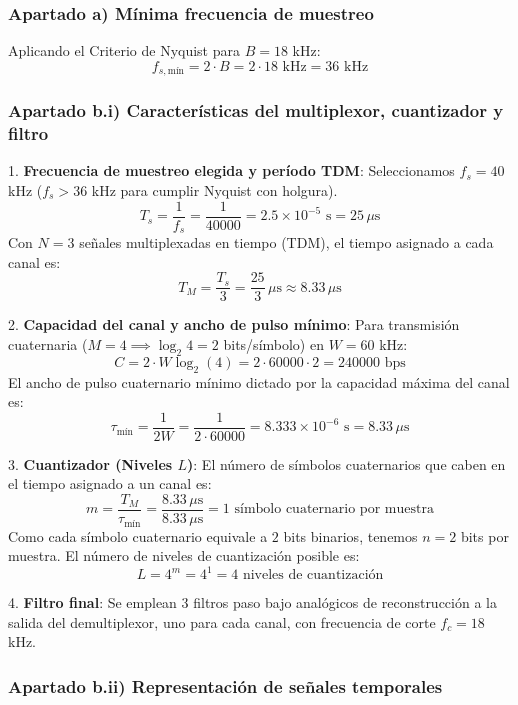 \newpage
\begin{resolucion}
\subsubsection*{Apartado a) Mínima frecuencia de muestreo}

Aplicando el Criterio de Nyquist para $B = 18$ kHz:
\[
f_{s,\text{mín}} = 2 \cdot B = 2 \cdot 18 \text{ kHz} = 36 \text{ kHz}
\]

\subsubsection*{Apartado b.i) Características del multiplexor, cuantizador y filtro}

1. \textbf{Frecuencia de muestreo elegida y período TDM}:
   Seleccionamos $f_s = 40$ kHz ($f_s > 36$ kHz para cumplir Nyquist con holgura).
   \[
   T_s = \frac{1}{f_s} = \frac{1}{40000} = 2.5 \times 10^{-5} \text{ s} = 25 \, \mu\text{s}
   \]
   Con $N=3$ señales multiplexadas en tiempo (TDM), el tiempo asignado a cada canal es:
   \[
   T_M = \frac{T_s}{3} = \frac{25}{3} \, \mu\text{s} \approx 8.33 \, \mu\text{s}
   \]

2. \textbf{Capacidad del canal y ancho de pulso mínimo}:
   Para transmisión cuaternaria ($M=4 \implies \log_2 4 = 2$ bits/símbolo) en $W = 60$ kHz:
   \[
   C = 2 \cdot W \log_2(4) = 2 \cdot 60000 \cdot 2 = 240000 \text{ bps}
   \]
   El ancho de pulso cuaternario mínimo dictado por la capacidad máxima del canal es:
   \[
   \tau_{\text{mín}} = \frac{1}{2W} = \frac{1}{2 \cdot 60000} = 8.333 \times 10^{-6} \text{ s} = 8.33 \, \mu\text{s}
   \]

3. \textbf{Cuantizador (Niveles $L$)}:
   El número de símbolos cuaternarios que caben en el tiempo asignado a un canal es:
   \[
   m = \frac{T_M}{\tau_{\text{mín}}} = \frac{8.33 \, \mu\text{s}}{8.33 \, \mu\text{s}} = 1 \text{ símbolo cuaternario por muestra}
   \]
   Como cada símbolo cuaternario equivale a $2$ bits binarios, tenemos $n = 2$ bits por muestra.
   El número de niveles de cuantización posible es:
   \[
   L = 4^m = 4^1 = 4 \text{ niveles de cuantización}
   \]

4. \textbf{Filtro final}:
   Se emplean 3 filtros paso bajo analógicos de reconstrucción a la salida del demultiplexor, uno para cada canal, con frecuencia de corte $f_c = 18$ kHz.

\newpage
\subsubsection*{Apartado b.ii) Representación de señales temporales}


\end{resolucion}
